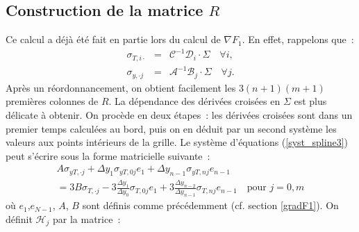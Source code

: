 \subsection*{Construction de la matrice $R$}

Ce calcul a d\'ej\`a \'et\'e fait en partie lors du calcul de 
$\nabla F_1$. En effet, rappelons que~:
\begin{eqnarray*}
\sigma_{T,i \cdot} &=& \mathcal{C}^{-1}\mathcal{D}_i 
\cdot \Sigma \quad \forall i, \label{R2}\\
\sigma_{y,\cdot j} &=& \mathcal{A}^{-1}\mathcal{B}_j 
\cdot \Sigma \quad \forall j.\label{R3}
\end{eqnarray*}
Apr\`es un r\'eordonnancement, on obtient facilement les 
$3(n+1)(m+1)$ premi\`eres colonnes de $R$. La d\'ependance des 
d\'eriv\'ees crois\'ees en $\Sigma$ est plus d\'elicate \`a obtenir. 
On proc\`ede en deux \'etapes~: les d\'eriv\'ees crois\'ees sont 
dans un premier temps calcul\'ees au bord, puis on en d\'eduit par 
un second syst\`eme les valeurs aux points int\'erieurs de la grille. 
Le syst\`eme d'\'equations (\ref{syst_spline3}) peut s'\'ecrire sous 
la forme matricielle suivante~:
\begin{multline*}
A\sigma_{yT,\cdot j} + \Delta y_1 \sigma_{yT,0j}e_1 + 
\Delta y_{n-1} \sigma_{yT,nj}e_{n-1}\\
= 3B\sigma_{T,\cdot j} - 
3\frac{\Delta y_1}{\Delta y_0}\sigma_{T,0j}e_1 
+ 3\frac{\Delta y_{n-2}}{\Delta y_{n-1}}\sigma_{T,nj}e_{n-1} 
\quad \text{pour } j=0,m
\end{multline*}
o\`u $e_1$,$e_{N-1}$, $A$, $B$ sont d\'efinis comme pr\'ec\'edemment 
(cf. section \ref{gradF1}). On d\'efinit $\mathcal{H}_j$ par la 
matrice~:
\setlength{\fboxsep}{31.8pt}
\setcounter{MaxMatrixCols}{20}
